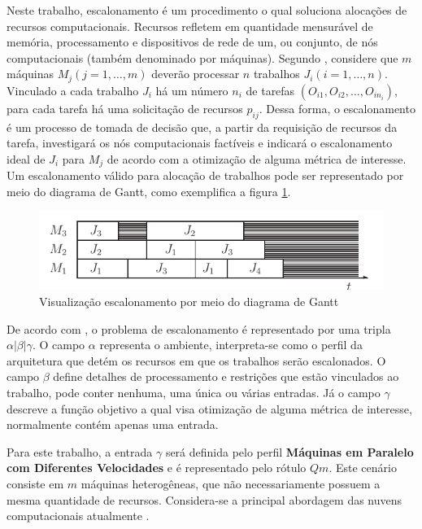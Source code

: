 Neste trabalho, escalonamento é um procedimento o qual soluciona alocações de recursos computacionais. Recursos refletem em quantidade mensurável de memória, processamento e dispositivos de rede de um, ou conjunto, de nós computacionais  (também denominado por máquinas). Segundo , considere que $m$ máquinas $M_j (j = 1, \dots, m)$ deverão processar $n$ trabalhos $J_i (i = 1, \dots, n)$. Vinculado a cada trabalho $J_i$ há um número $n_i$ de tarefas $(O_{i1}, O_{i2}, \dots, O_{in_i})$, para cada tarefa há uma solicitação de recursos $p_{ij}$. Dessa forma, o escalonamento é um processo de tomada de decisão que, a partir da requisição de recursos da tarefa,  investigará os nós computacionais  factíveis e indicará o escalonamento ideal de $J_i$ para $M_j$ de acordo com a otimização de alguma métrica de interesse. Um escalonamento válido para alocação de trabalhos pode ser representado por meio do diagrama de Gantt, como exemplifica a figura \ref{gantt-schedulling}.

\begin{figure}[ht!]
    \caption{\label{gantt-schedulling}Visualização escalonamento por meio do diagrama de Gantt}
    \centering
    \includegraphics[width=\linewidth]{assets/gantt-scheduling.pdf}
\end{figure}

De acordo com \cite{pinedo2012scheduling}, o problema de escalonamento é representado por uma tripla $\alpha|\beta|\gamma$. O campo $\alpha$ representa o ambiente, interpreta-se como o perfil da arquitetura que detém os recursos em que os trabalhos serão escalonados. O campo $\beta$ define detalhes de processamento e restrições que estão vinculados ao trabalho, pode conter nenhuma, uma única ou várias entradas. Já o campo $\gamma$ descreve a função objetivo a qual visa otimização de alguma métrica de interesse, normalmente contém apenas uma entrada.

Para este trabalho, a entrada $\gamma$ será definida pelo perfil \textbf{Máquinas em Paralelo com Diferentes Velocidades} e é representado pelo rótulo $Qm$. Este cenário consiste em $m$ máquinas heterogêneas, que não necessariamente possuem a mesma quantidade de recursos. Considera-se a principal abordagem das nuvens computacionais atualmente \cite{krauter2002taxonomy}.

